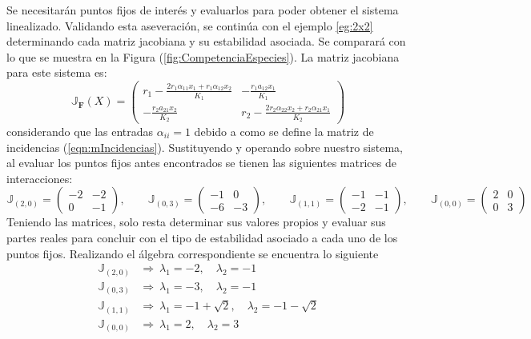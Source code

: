\setlength{\parindent}{0cm}	Se necesitarán puntos fijos de interés y evaluarlos para poder obtener el sistema linealizado. Validando esta aseveración, se continúa con el ejemplo \ref{eg:2x2} determinando cada matriz jacobiana y su estabilidad asociada. Se comparará con lo que se muestra en la Figura (\ref{fig:CompetenciaEspecies}). La matriz jacobiana para este sistema es:
\begin{equation}\label{eqn:Jacobiano2}
	\mathbb{J}_\mathbf{F}(X)=\begin{pmatrix}
		r_1-\frac{2r_1\alpha_{11}x_1+r_1\alpha_{12}x_2}{K_1} & -\frac{r_1a_{12}x_1}{K_1}\\
		-\frac{r_2a_{21}x_2}{K_2} & r_2-\frac{2r_2\alpha_{22}x_2+r_2\alpha_{21}x_1}{K_2}
	\end{pmatrix}
\end{equation}
considerando que las entradas $\alpha_{ii}=1$ debido a como se define la matriz de incidencias (\ref{eqn:mIncidencias}). Sustituyendo y operando sobre nuestro sistema, al evaluar los puntos fijos antes encontrados se tienen las siguientes matrices de interacciones:
$$
\mathbb{J}_{(2,0)} = \begin{pmatrix}
	-2 & -2\\
	0 & -1
\end{pmatrix},\qquad \mathbb{J}_{(0,3)}=\begin{pmatrix}
	-1 & 0\\
	-6 & -3
\end{pmatrix},\qquad \mathbb{J}_{(1,1)}=\begin{pmatrix}
	-1 & -1\\
	-2 & -1
\end{pmatrix},\qquad \mathbb{J}_{(0,0)}=\begin{pmatrix}
	2 & 0 \\
	0 & 3
\end{pmatrix}
$$
Teniendo las matrices, solo resta determinar sus valores propios y evaluar sus partes reales para concluir con el tipo de estabilidad asociado a cada uno de los puntos fijos. Realizando el álgebra correspondiente se encuentra lo siguiente
\begin{align*}
	\mathbb{J}_{(2,0)}&\Longrightarrow\ \lambda_1 = -2,\quad\lambda_2 = -1\\
	\mathbb{J}_{(0,3)}&\Longrightarrow\ \lambda_1 = -3,\quad\lambda_2 = -1\\
	\mathbb{J}_{(1,1)}&\Longrightarrow\ \lambda_1 = -1+\sqrt{2},\quad\lambda_2 = -1-\sqrt{2}\\
	\mathbb{J}_{(0,0)}&\Longrightarrow\ \lambda_1 = 2,\quad\lambda_2 = 3\\
\end{align*}
